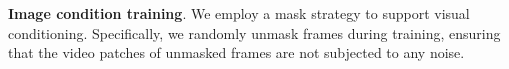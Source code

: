 \noindent \textbf{Image condition training}. We employ a mask strategy to support visual conditioning. Specifically, we randomly unmask frames during training, ensuring that the video patches of unmasked frames are not subjected to any noise.


